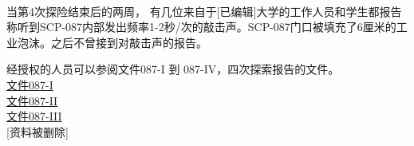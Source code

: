 \\
当第4次探险结束后的两周， 有几位来自于{[}已编辑]大学的工作人员和学生都报告称听到SCP-087内部发出频率1-2秒\slash 次的敲击声。SCP-087门口被填充了6厘米的工业泡沫。之后不曾接到对敲击声的报告。

经授权的人员可以参阅文件087-I 到 087-IV，四次探索报告的文件。\\
\hyperref[sec:DOC-document-087-i]{文件087-I}\\
\hyperref[sec:DOC-document-087-ii]{文件087-II}\\
\hyperref[sec:DOC-document-087-iii]{文件087-III}\\
{[}资料被删除]

\newpage


\newpage


\newpage

